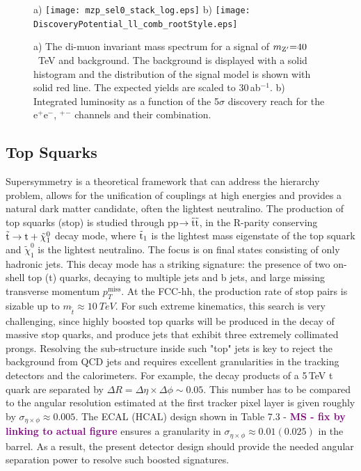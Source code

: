 \documentclass[11pt,twoside,a4paper]{cernrep}
\newcommand{\MS}[1]{\textbf{\textcolor{purple}{MS - #1}}}
\begin{document}
%
%
%
\begin{figure}
  \centering
  a)
  \texttt{[image: mzp\_sel0\_stack\_log.eps]}
  b)
  \texttt{[image: DiscoveryPotential\_ll\_comb\_rootStyle.eps]}
  \caption{a) The di-muon invariant mass spectrum for a signal of $m_{\rm Z^{\prime}} {=} 40$~TeV and background. The background is displayed with a solid histogram and the distribution of the signal model is shown with solid red line. The expected yields are scaled to 30\,ab$^{-1}$. b) Integrated luminosity as a function of the 5$\sigma$ discovery reach for the e$^+$e$^-$, \textmu$^+$\textmu$^-$ channels and their combination.}
  \label{zprime}
\end{figure}


\subsection{Top Squarks}

Supersymmetry is a theoretical framework that can address the hierarchy problem, allows for the unification of couplings at high energies and provides a natural dark matter candidate, often the lightest neutralino. The production of top squarks (stop) is studied through pp$\rightarrow \tilde{\rm t} \tilde{\rm t}$, in the R-parity conserving $\rm \tilde{t} \rightarrow t + \tilde{\chi}_1^{0}$ decay mode, where $\rm \tilde{t}_{1}$ is the lightest mass eigenstate of the top squark and $\tilde{\chi}_1^{0}$ is the lightest neutralino. The focus is on final states consisting of only hadronic jets. This decay mode has a striking signature: the presence of two on-shell top (t) quarks, decaying to multiple jets and b jets, and large missing transverse momentum $p_T^{\mathrm{miss}}$. At the FCC-hh, the production rate of stop pairs is sizable up to $m_{\tilde{t}} \approx 10~TeV$. For such extreme kinematics, this search is very challenging, since highly boosted top quarks will be produced in the decay of massive stop quarks, and produce jets that exhibit three extremely collimated prongs. Resolving the sub-structure inside such "top" jets is key to reject the background from QCD jets and requires excellent granularities in the tracking detectors and the calorimeters. For example, the decay products of a 5\,TeV t quark are separated by $\Delta R {=} \Delta \eta \times \Delta \phi \sim 0.05$. This number has to be compared to the angular resolution estimated at the first tracker pixel layer is given roughly by $\sigma_{\eta \times \phi} \approx 0.005$. The ECAL (HCAL) design shown in Table 7.3  - \MS{fix by linking to actual figure} ensures a granularity in $\sigma_{\eta \times \phi} \approx 0.01 (0.025)$ in the barrel. As a result, the present detector design should provide the needed angular separation power to resolve such boosted signatures.
\end{document}
